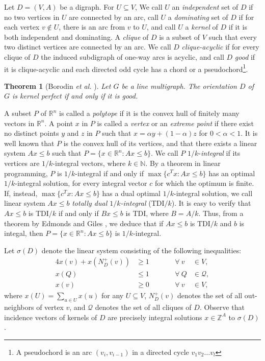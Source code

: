 \documentclass[11pt]{article}
\newtheorem{theorem}{Theorem}%
\numberwithin{theorem}{section}
\begin{document}
Let $D=(V,A)$ be a digraph. 
For $U\subseteq V$, We call $U$ an \textit{independent} set of $D$ if no two vertices in $U$ are connected by an arc, call $U$ a \textit{dominating} set of $D$ if for each vertex $v\not\in U$, there is an arc from $v$ to $U$, and call $U$ a \textit{kernel} of $D$ if it is both independent and dominating. 
A \textit{clique} of $D$ is a subset of $V$ such that every two distinct vertices are connected by an arc. We call $D$ \textit{clique-acyclic} if for every clique of $D$ the induced subdigraph of one-way arcs is acyclic, and call $D$ \textit{good} if it is clique-acyclic and each directed odd cycle has a chord or a pseudochord\footnote{A pseudochord is an arc $(v_i,v_{i-1})$ in a directed cycle $v_1 v_2\ldots v_l$}. 

\begin{theorem}[Borodin \textit{et al.} \cite{BoroKost98}]
\label{thm:BoroKost98}
Let $G$ be a line multigraph. The orientation $D$ of $G$ is kernel perfect if and only if it is good.
\end{theorem}

A subset $P$ of $\mathbb{R}^n$ is called a \textit{polytope} if it is the convex hull of finitely many vectors in $\mathbb{R}^n$. A point $x$ in $P$ is called a \textit{vertex} or an \textit{extreme point} if there exist no distinct points $y$ and $z$ in $P$ such that $x=\alpha y+ (1-\alpha)z$ for $0<\alpha<1$. It is well known that $P$ is the convex hull of its vertices, and that there exists a linear system $Ax\leq b$ such that $P=\{x\in\mathbb{R}^n:Ax\leq b\}$. We call $P$ $1/k$-\textit{integral} if its vertices are $1/k$-integral vectors, where $k\in\mathbb{N}$. By a theorem in linear programming, $P$ is $1/k$-integral if and only if $\max\{c^T x:Ax\leq b\}$ has an optimal $1/k$-integral solution, for every integral vector $c$ for which the optimum is finite. If, instead, $\max\{c^T x:Ax\leq b\}$ has a dual optimal $1/k$-integral solution, we call linear system $Ax\leq b$ \textit{totally dual $1/k$-integral} (TDI$/k$).
It is easy to verify that $Ax\leq b$ is TDI$/k$ if and only if $Bx\leq b$ is TDI, where $B=A/k$. Thus, from a theorem by Edmonds and Giles \cite{EdmoGile77}, we deduce that if $Ax\leq b$ is TDI$/k$ and $b$ is integal, then $P=\{x\in\mathbb{R}^n:Ax\leq b\}$ is $1/k$-integral.

Let $\sigma(D)$ denote the linear system consisting of the following inequalities:
\begin{alignat}{4}
x(v)+x(N^+_{D}(v)) &\geq 1 &\qquad &\forall ~ v~&\in V, \label{domination constraints}\\
x(Q)&\leq 1 &\qquad &\forall ~ Q &\in \mathcal{Q}, \label{independence constraints}\\
x(v) &\geq 0 &\qquad &\forall ~ v~&\in V, \label{vertex nonnegativity}
\end{alignat}
where $x(U)=\sum_{u\in U}x(u)$ for any $U\subseteq V$, $N_D^+(v)$ denotes the set of all out-neighbors of vertex $v$, and $\mathcal{Q}$ denotes the set of all cliques of $D$. Observe that incidence vectors of kernels of $D$ are precisely integral solutions $x\in \mathbb{Z}^A$ to $\sigma(D)$.
\end{document}
